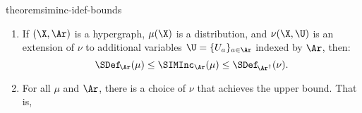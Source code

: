 \begin{linked}{theorem}{siminc-idef-bounds}
    \begin{enumerate}[label={\normalfont(\alph*)},wide,topsep=0pt,itemsep=0pt,parsep=0pt]
    \item
    If $(\X,\Ar)$ is a hypergraph,
     $\mu(\X)$ is a distribution, and $\nu(\X,\U)$ is an extension of $\nu$ to additional variables $\U = \{U_a \}_{a \in \Ar}$ indexed by $\Ar$, then:
    \[
        \SDef_{\!\Ar}(\mu) \le
        \SIMInc_{\Ar}(\mu)
        \le \SDef_{\!\Ar^\dagger}(\nu).
    \]
    \item 
    For all $\mu$ and $\Ar$, there is a choice of $\nu$ that achieves the upper bound.
    That is, 

\end{enumerate}
\end{linked}
